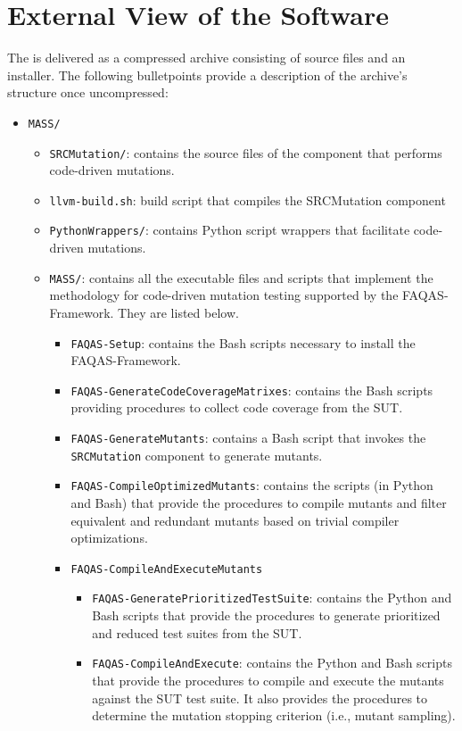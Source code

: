 
\chapter{External View of the Software}

The \FAQAS is delivered as a compressed archive consisting of source files and an installer.
The following bulletpoints provide a description of the archive's structure once uncompressed:

\begin{itemize}
	\item \texttt{MASS/}
	\begin{itemize}
		\item \texttt{SRCMutation/}: contains the source files of the component that performs code-driven mutations.
		\item \texttt{llvm-build.sh}: build script that compiles the SRCMutation component
		\item \texttt{PythonWrappers/}: contains Python script wrappers that facilitate code-driven mutations.
		\item \texttt{MASS/}: contains all the executable files and scripts that implement the methodology for code-driven mutation testing supported by  the FAQAS-Framework. They are listed below.
		\begin{itemize}
			\item \texttt{FAQAS-Setup}: contains the Bash scripts necessary to install the FAQAS-Framework.
			\item \texttt{FAQAS-GenerateCodeCoverageMatrixes}: contains the Bash scripts providing procedures to collect code coverage from the SUT.
			\item \texttt{FAQAS-GenerateMutants}: contains a Bash script that invokes the \texttt{SRCMutation} component to generate mutants.
			\item \texttt{FAQAS-CompileOptimizedMutants}: contains the scripts (in Python and Bash)  that provide the procedures to compile mutants and filter equivalent and redundant mutants based on trivial compiler optimizations.
			\item \texttt{FAQAS-CompileAndExecuteMutants}
			\begin{itemize}
				\item \texttt{FAQAS-GeneratePrioritizedTestSuite}: contains the Python and Bash scripts that provide the procedures to generate prioritized and reduced test suites from the SUT.

				\item \texttt{FAQAS-CompileAndExecute}: contains the Python and Bash scripts that provide the procedures to compile and execute the mutants against the SUT test suite. It also provides the procedures to determine the mutation stopping criterion (i.e., mutant sampling).


\end{itemize}
\end{itemize}
\end{itemize}
\end{itemize}
